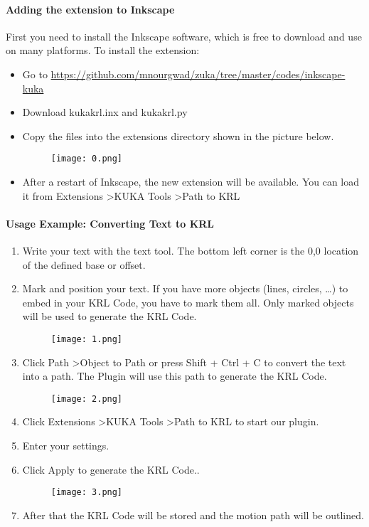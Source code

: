 \paragraph{Adding the extension to Inkscape}
First you need to install the Inkscape software, which is free to download and use on many platforms.
To install the extension:
\begin{itemize}
	\item Go to \url{https://github.com/mnourgwad/zuka/tree/master/codes/inkscape-kuka}
	\item Download kukakrl.inx and kukakrl.py
	\item Copy the files into the extensions directory shown in the picture below.\
	\begin{figure}[H]
		\centering
		\texttt{[image: 0.png]}
	\end{figure}
\item After a restart of Inkscape, the new extension will be available.
You can load it from Extensions \textgreater KUKA Tools \textgreater Path to KRL

\end{itemize}
\paragraph{Usage Example: Converting Text to KRL}
	
\begin{enumerate}
	\item Write your text with the text tool. The bottom left corner is the 0,0 location of the defined base or offset.
	\item Mark and position your text. If you have more objects (lines, circles, …) to embed in your KRL Code, you have to mark them all. Only marked objects will be used to generate the KRL Code.
		\begin{figure}[H]
		\centering
		\texttt{[image: 1.png]}
	\end{figure}
	\item Click Path \textgreater Object to Path or press Shift + Ctrl + C to convert the text into a path. The Plugin will use this path to generate the KRL Code.
	\begin{figure}[H]
		\centering
		\texttt{[image: 2.png]}
	\end{figure}
	\item Click Extensions \textgreater KUKA Tools \textgreater Path to KRL to start our plugin.
	
	\item Enter your settings.
	\item Click Apply to generate the KRL Code..
		\begin{figure}[H]
	\centering
		\texttt{[image: 3.png]}
		\end{figure}
   \item After that the KRL Code will be stored and the motion path will be outlined.
   
\end{enumerate}

